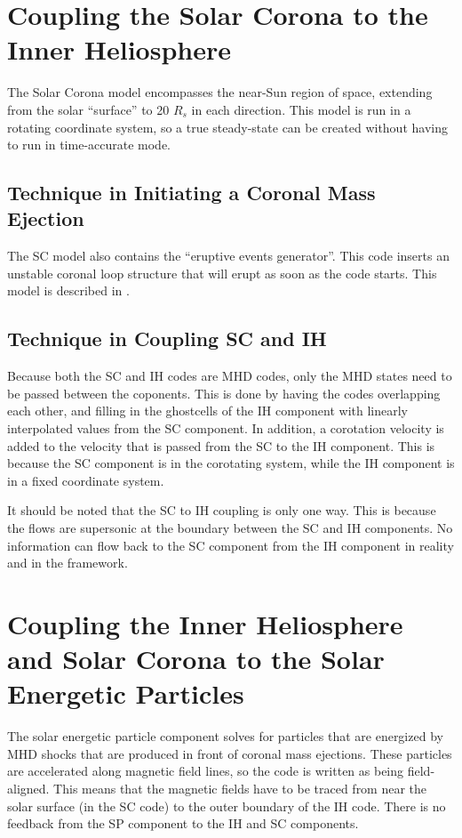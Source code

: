 \documentclass[twoside,10pt]{article}
\begin{document}
\section{Coupling the Solar Corona to the Inner Heliosphere}

The Solar Corona model encompasses the near-Sun region of space,
extending from the solar ``surface'' to 20 $R_s$ in each direction.
This model is run in a rotating coordinate system, so a true
steady-state can be created without having to run in time-accurate
mode.

\subsection{Technique in Initiating a Coronal Mass Ejection}

The SC model also contains the ``eruptive events generator''.  This
code inserts an unstable coronal loop structure that will erupt as
soon as the code starts.  This model is described in
\cite{manchester_cme}.

\subsection{Technique in Coupling SC and IH}

Because both the SC and IH codes are MHD codes, only the MHD states
need to be passed between the coponents.  This is done by having the
codes overlapping each other, and filling in the ghostcells of the IH
component with linearly interpolated values from the SC component.  In
addition, a corotation velocity is added to the velocity that is
passed from the SC to the IH component.  This is because the SC
component is in the corotating system, while the IH component is in a
fixed coordinate system.

It should be noted that the SC to IH coupling is only one way.  This
is because the flows are supersonic at the boundary between the SC and
IH components.  No information can flow back to the SC component from
the IH component in reality and in the framework.

\section{Coupling the Inner Heliosphere and Solar Corona to the 
Solar Energetic Particles}

The solar energetic particle component solves for particles that are
energized by MHD shocks that are produced in front of coronal mass
ejections.  These particles are accelerated along magnetic field
lines, so the code is written as being field-aligned.  This means that
the magnetic fields have to be traced from near the solar surface (in
the SC code) to the outer boundary of the IH code.  There is no
feedback from the SP component to the IH and SC components.
\end{document}
